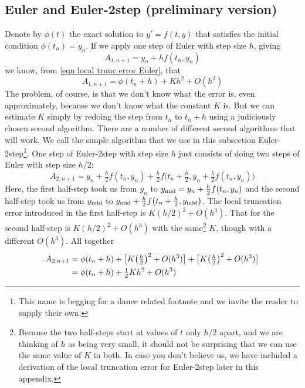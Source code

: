 \subsection{Euler and Euler-2step (preliminary version)}\label{ssec prelim E E2}
Denote by $\phi(t)$ the exact solution to $y'=f(t,y)$ that satisfies the
initial condition $\phi(t_n)=y_n$. 
If we apply one step of Euler with step size $h$, giving
\begin{equation*}
A_{1,n+1}=y_n+hf(t_n,y_n)
\end{equation*}
we know, from \eqref{eqn local trunc error Euler}, that 
\begin{equation*}
A_{1,n+1}=\phi(t_n+h)+Kh^2+O(h^3)
\end{equation*}
The problem, of course, is that we don't know what the error is, even
approximately, because we don't know what the constant $K$ is. 
But we can estimate $K$ simply by redoing the step from $t_n$  to $t_n+h$
using a judiciously chosen second algorithm. There are a number of 
different second algorithms that will work. We call the simple algorithm 
that we use in this subsection Euler-2step\footnote{This name is begging for a 
dance related footnote and we invite the reader to supply their own.}. 
One step of Euler-2step with step size $h$ just consists of doing two steps 
of Euler with step size $h/2$:
\begin{equation*}
A_{2,n+1} = y_n+\tfrac{h}{2}f(t_n,y_n)
            +\tfrac{h}{2}f\big(t_n+\tfrac{h}{2},y_n+\tfrac{h}{2}f(t_n,y_n)\big)
\end{equation*}
Here, the first half-step took us from $y_n$ to 
$y_{\rm mid}=y_n+\frac{h}{2}f(t_n,y_n)$ and the second half-step took
us from $y_{\rm mid}$ to 
$y_{\rm mid}+\frac{h}{2}f\big(t_n+\frac{h}{2},y_{\rm mid}\big)$.
The local truncation error
introduced in the first half-step is $K(h/2)^2+O(h^3)$. That for
the second half-step is $K(h/2)^2+O(h^3)$ with the same\footnote{Because 
the two half-steps start at values of $t$ only $h/2$ apart, and we are 
thinking of $h$ as being very small, it should not be surprising that 
we can use the same value of $K$ in both. In case you don't believe us, 
we have included a derivation of the local truncation error for Euler-2step 
later in this appendix.} $K$, though with a different $O(h^3)$.
All together
\begin{align*}
A_{2,n+1}&=\phi(t_n+h)+\big[ K\big(\tfrac{h}{2}\big)^2+O(h^3)\big]
                   + \big[K\big(\tfrac{h}{2}\big)^2+O(h^3)\big] \\
&=\phi(t_n+h)+\tfrac{1}{2} Kh^2+O(h^3)
\end{align*}
